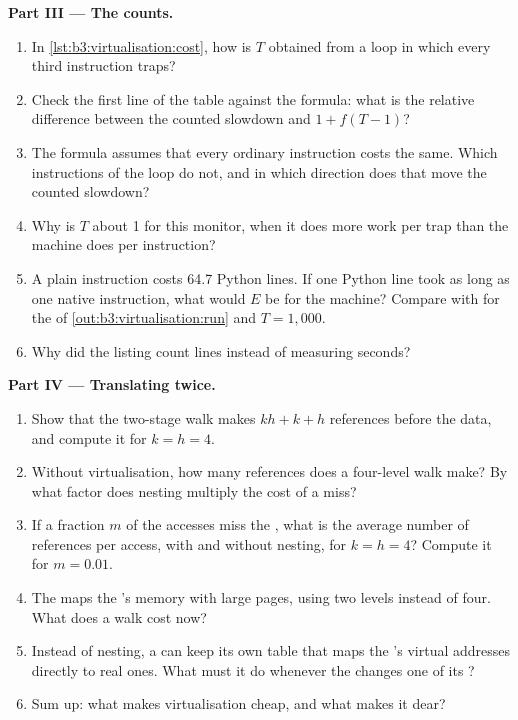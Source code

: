 \begin{problem}
\medskip\noindent\textbf{Part III --- The counts.}
\begin{enumerate}[resume]
\item In \cref{lst:b3:virtualisation:cost}, how is $T$ obtained from a loop in which every third instruction traps?
\item Check the first line of the table against the formula: what is the relative difference between the counted slowdown and $1 + f(T - 1)$?
\item The formula assumes that every ordinary instruction costs the same. Which instructions of the loop do not, and in which direction does that move the counted slowdown?
\item Why is $T$ about 1 for this monitor, when it does more work per trap than the machine does per instruction?
\item A plain instruction costs 64.7 Python lines. If one Python line took as long as one native instruction, what would $E$ be for the  machine? Compare with  for the  of \cref{out:b3:virtualisation:run} and $T = 1{,}000$.
\item Why did the listing count lines instead of measuring seconds?
\end{enumerate}

\medskip\noindent\textbf{Part IV --- Translating twice.}
\begin{enumerate}[resume]
\item Show that the two-stage walk makes $kh + k + h$ references before the data, and compute it for $k = h = 4$.
\item Without virtualisation, how many references does a four-level walk make? By what factor does nesting multiply the cost of a  miss?
\item If a fraction $m$ of the accesses miss the , what is the average number of references per access, with and without nesting, for $k = h = 4$? Compute it for $m = 0.01$.
\item The  maps the 's memory with large pages, using two levels instead of four. What does a walk cost now?
\item Instead of nesting, a  can keep its own table that maps the 's virtual addresses directly to real ones. What must it do whenever the  changes one of its ?
\item Sum up: what makes virtualisation cheap, and what makes it dear?
\end{enumerate}
\end{problem}
